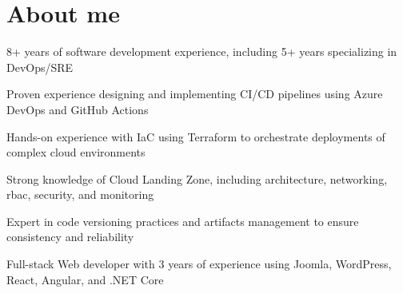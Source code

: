 \documentclass[]{deedy-resume-openfont}
\begin{document}
    
%
%
%
%
\sectionsep
\sectionsep
\section{About me}
\vspace{2pt}
\begin{tightemize}
	\item 8+ years of software development experience, including 5+ years specializing in DevOps/SRE
	\item Proven experience designing and implementing CI/CD pipelines using Azure DevOps and GitHub Actions
	\item Hands-on experience with IaC using Terraform to orchestrate deployments of complex cloud environments
	\item Strong knowledge of Cloud Landing Zone, including architecture, networking, rbac, security, and monitoring
	\item Expert in code versioning practices and artifacts management to ensure consistency and reliability
	\item Full-stack Web developer with 3 years of experience using Joomla, WordPress, React, Angular, and .NET Core
\end{tightemize}
%
%
\end{document}

